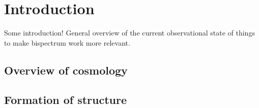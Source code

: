 \chapter{Introduction}
\label{chapter:introgen}

Some introduction! General overview of the current observational state of things to make bispectrum work more relevant.

\section{Overview of cosmology}

\section{Formation of structure}

